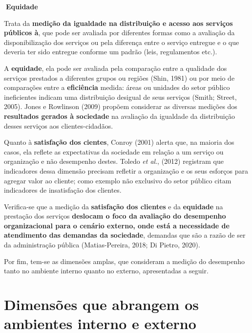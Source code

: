 \documentclass[
  letterpaper,
  DIV=11,
  numbers=noendperiod]{scrreprt}
\begin{document}
\begin{tcolorbox}[enhanced jigsaw, bottomrule=.15mm, arc=.35mm, breakable, toprule=.15mm, rightrule=.15mm, opacityback=0, left=2mm, colback=white, leftrule=.75mm]

\textbf{🔽{Equidade}}\vspace{2mm}

Trata da \textbf{medição da igualdade na distribuição e acesso aos
serviços públicos à}, que pode ser avaliada por diferentes formas como a
avaliação da disponibilização dos serviços ou pela diferença entre o
serviço entregue e o que deveria ter sido entregue conforme um padrão
(leis, regulamentos etc.).

\end{tcolorbox}

A \textbf{equidade}, ela pode ser avaliada pela comparação entre a
qualidade dos serviços prestados a diferentes grupos ou regiões (Shin,
1981) ou por meio de comparações entre a \textbf{eficiência} medida:
áreas ou unidades do setor público ineficientes indicam uma distribuição
desigual de seus serviços (Smith; Street, 2005). Jones e Rowlinson
(2009) propõem considerar as diversas medições dos \textbf{resultados
gerados à sociedade} na avaliação da igualdade da distribuição desses
serviços aos clientes-cidadãos.

Quanto à \textbf{satisfação dos cientes}, Conroy (2001) alerta que, na
maioria dos casos, ela reflete as expectativas da sociedade em relação a
um serviço ou organização e não desempenho destes. Toledo \emph{et al}.,
(2012) registram que indicadores dessa dimensão precisam refletir a
organização e os seus esforços para agregar valor ao cliente; como
exemplo não exclusivo do setor público citam indicadores de insatisfação
dos clientes.

Verifica-se que a medição da \textbf{satisfação dos clientes} e da
\textbf{equidade} na prestação dos serviços \textbf{deslocam o foco da
avaliação do desempenho organizacional para o cenário externo, onde está
a necessidade de atendimento das demandas da sociedade}, demandas que
são a razão de ser da administração pública (Matias-Pereira, 2018; Di
Pietro, 2020).

Por fim, tem-se as dimensões amplas, que consideram a medição do
desempenho tanto no ambiente interno quanto no externo, apresentadas a
seguir.

\hypertarget{dimensuxf5es-que-abrangem-os-ambientes-interno-e-externo}{%
\section{Dimensões que abrangem os ambientes interno e
externo}\label{dimensuxf5es-que-abrangem-os-ambientes-interno-e-externo}}
\end{document}
